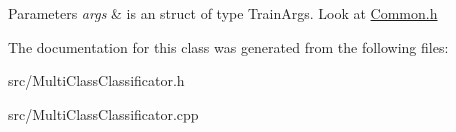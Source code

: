 \begin{DoxyParams}{Parameters}
{\em args} & is an struct of type Train\-Args. Look at \hyperlink{_common_8h_source}{Common.\-h} \\
\hline
\end{DoxyParams}


The documentation for this class was generated from the following files\-:\begin{DoxyCompactItemize}
\item 
src/Multi\-Class\-Classificator.\-h\item 
src/Multi\-Class\-Classificator.\-cpp\end{DoxyCompactItemize}
